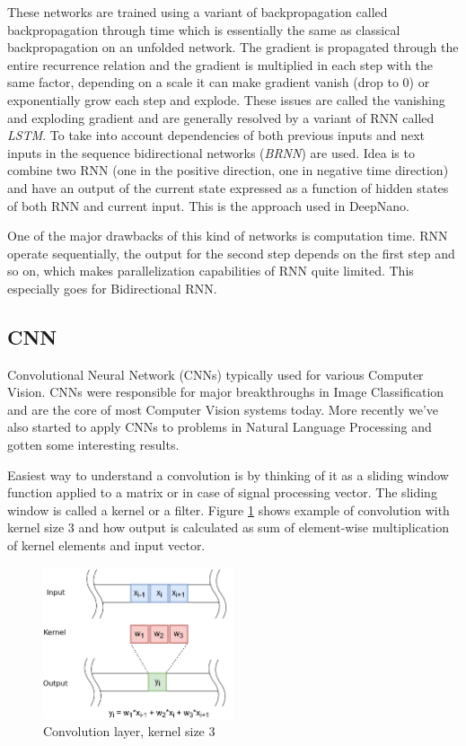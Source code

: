 \documentclass[times, utf8, diplomski, numeric, english]{fer}
\begin{document}
These networks are trained using a variant of backpropagation called backpropagation through time which is essentially the same as classical backpropagation on an unfolded network. The gradient is propagated through the entire recurrence relation and the gradient is multiplied in each step with the same factor, depending on a scale it can make gradient vanish (drop to 0) or exponentially grow each step and explode. These issues are called the vanishing and exploding gradient\cite{rnn-blog} and are generally resolved by a variant of RNN called \textit{LSTM}\cite{hochreiter1997long}. To take into account dependencies of both previous inputs and next inputs in the sequence bidirectional networks (\textit{BRNN}) are used.  Idea is to combine two RNN (one in the positive direction, one in negative time direction) and have an output of the current state expressed as a function of hidden states of both RNN and current input. This is the approach used in DeepNano\cite{Boza2017}. 


One of the major drawbacks of this kind of networks is computation time. RNN operate sequentially, the output for the second step depends on the first step and so on, which makes parallelization capabilities of RNN quite limited. This especially goes for Bidirectional RNN.

\subsection{CNN}
Convolutional Neural Network (CNNs) typically used for various Computer Vision. CNNs were responsible for major breakthroughs in Image Classification and are the core of most Computer Vision systems today. More recently we’ve also started to apply CNNs to problems in Natural Language Processing and gotten some interesting results.

Easiest way to understand a convolution is by thinking of it as a sliding window function applied to a matrix or in case of signal processing vector. The sliding window is called a kernel or a filter. Figure \ref{fg:convolution} shows example of convolution with kernel size 3 and how output is calculated as sum of element-wise multiplication of kernel elements and input vector.
\begin{figure}[!ht]
	\begin{center}
		\includegraphics[width=0.5\textwidth]{./imgs/convolution.png}
		\caption{Convolution layer, kernel size 3}
		\label{fg:convolution}
	\end{center}
\end{figure}
\end{document}
